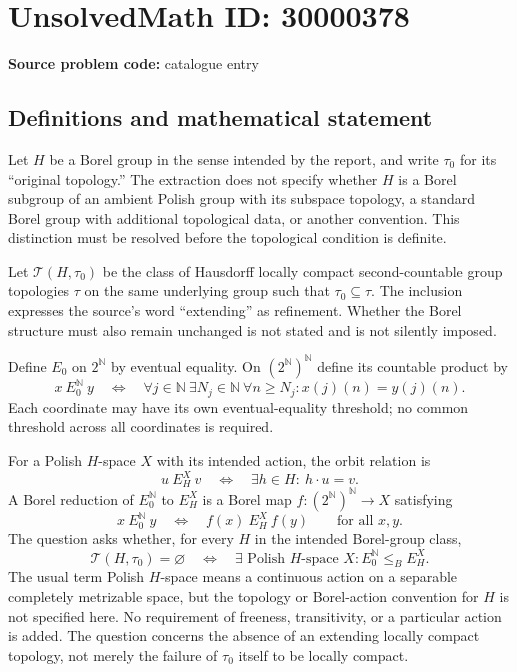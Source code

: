 \documentclass[11pt]{article}
\newcommand{\N}{\mathbb{N}}
\begin{document}
\section*{UnsolvedMath ID: 30000378}
\textbf{Source problem code:} catalogue entry
\subsection{Definitions and mathematical statement}
Let $H$ be a Borel group in the sense intended by the report, and write $\tau_0$ for its ``original topology.'' The extraction does not specify whether $H$ is a Borel subgroup of an ambient Polish group with its subspace topology, a standard Borel group with additional topological data, or another convention. This distinction must be resolved before the topological condition is definite.

Let $\mathcal T(H,\tau_0)$ be the class of Hausdorff locally compact second-countable group topologies $\tau$ on the same underlying group such that $\tau_0\subseteq\tau$. The inclusion expresses the source's word ``extending'' as refinement. Whether the Borel structure must also remain unchanged is not stated and is not silently imposed.

Define $E_0$ on $2^{\N}$ by eventual equality. On $(2^{\N})^{\N}$ define its countable product by
\[
 x\ E_0^{\N}\ y
 \quad\Longleftrightarrow\quad
 \forall j\in\N\ \exists N_j\in\N\ \forall n\ge N_j:
       x(j)(n)=y(j)(n).
\]
Each coordinate may have its own eventual-equality threshold; no common threshold across all coordinates is required.

For a Polish $H$-space $X$ with its intended action, the orbit relation is
\[
 u\ E_H^X\ v\quad\Longleftrightarrow\quad
 \exists h\in H:\ h\cdot u=v.
\]
A Borel reduction of $E_0^{\N}$ to $E_H^X$ is a Borel map $f:(2^{\N})^{\N}\to X$ satisfying
\[
 x\ E_0^{\N}\ y\quad\Longleftrightarrow\quad
 f(x)\ E_H^X\ f(y)
 \qquad\text{for all }x,y.
\]
The question asks whether, for every $H$ in the intended Borel-group class,
\[
 \mathcal T(H,\tau_0)=\varnothing
 \quad\Longleftrightarrow\quad
 \exists\text{ Polish }H\text{-space }X:
             E_0^{\N}\le_B E_H^X.
\]
The usual term Polish $H$-space means a continuous action on a separable completely metrizable space, but the topology or Borel-action convention for $H$ is not specified here. No requirement of freeness, transitivity, or a particular action is added. The question concerns the absence of an extending locally compact topology, not merely the failure of $\tau_0$ itself to be locally compact.
\end{document}
